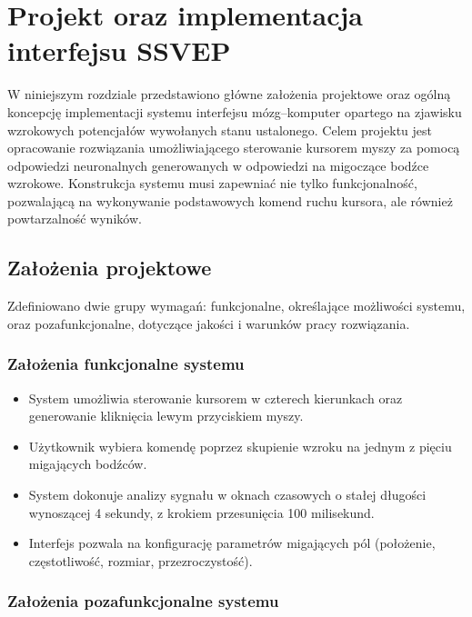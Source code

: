 
\chapter{Projekt oraz implementacja interfejsu SSVEP}

W niniejszym rozdziale przedstawiono główne założenia projektowe oraz ogólną koncepcję implementacji systemu interfejsu mózg--komputer opartego na zjawisku wzrokowych potencjałów wywołanych stanu ustalonego.
Celem projektu jest opracowanie rozwiązania umożliwiającego sterowanie kursorem myszy za pomocą odpowiedzi neuronalnych generowanych w odpowiedzi na migoczące bodźce wzrokowe.
Konstrukcja systemu musi zapewniać nie tylko funkcjonalność, pozwalającą na wykonywanie podstawowych komend ruchu kursora, ale również powtarzalność wyników.

\section{Założenia projektowe}

Zdefiniowano dwie grupy wymagań: funkcjonalne, określające możliwości systemu, oraz pozafunkcjonalne, dotyczące jakości i warunków pracy rozwiązania.

\subsection*{Założenia funkcjonalne systemu}

\begin{itemize}
    \item System umożliwia sterowanie kursorem w czterech kierunkach oraz generowanie kliknięcia lewym przyciskiem myszy.
    \item Użytkownik wybiera komendę poprzez skupienie wzroku na jednym z pięciu migających bodźców.
    \item System dokonuje analizy sygnału w oknach czasowych o stałej długości wynoszącej 4 sekundy, z krokiem przesunięcia 100 milisekund.
    \item Interfejs pozwala na konfigurację parametrów migających pól (położenie, częstotliwość, rozmiar, przezroczystość).
\end{itemize}

\subsection*{Założenia pozafunkcjonalne systemu}

